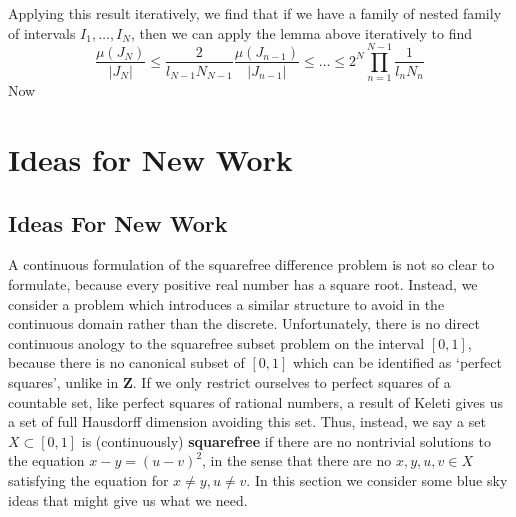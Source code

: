 \documentclass{report}
\theoremstyle{plain}
\theoremstyle{plain}
\begin{document}
Applying this result iteratively, we find that if we have a family of nested family of intervals $I_1, \dots, I_N$, then we can apply the lemma above iteratively to find
%
\[ \frac{\mu(J_N)}{|J_N|} \leq \frac{2}{l_{N-1} N_{N-1}} \frac{\mu(J_{n-1})}{|J_{n-1}|} \leq \dots \leq 2^N \prod_{n = 1}^{N-1} \frac{1}{l_nN_n} \]
%
Now













\chapter{Ideas for New Work}

\section{Ideas For New Work}

A continuous formulation of the squarefree difference problem is not so clear to formulate, because every positive real number has a square root. Instead, we consider a problem which introduces a similar structure to avoid in the continuous domain rather than the discrete. Unfortunately, there is no direct continuous anology to the squarefree subset problem on the interval $[0,1]$, because there is no canonical subset of $[0,1]$ which can be identified as `perfect squares', unlike in $\mathbf{Z}$. If we only restrict ourselves to perfect squares of a countable set, like perfect squares of rational numbers, a result of Keleti gives us a set of full Hausdorff dimension avoiding this set. Thus, instead, we say a set $X \subset [0,1]$ is (continuously) {\bf squarefree} if there are no nontrivial solutions to the equation $x - y = (u - v)^2$, in the sense that there are no $x,y,u,v \in X$ satisfying the equation for $x \neq y, u \neq v$. In this section we consider some blue sky ideas that might give us what we need.
\end{document}

